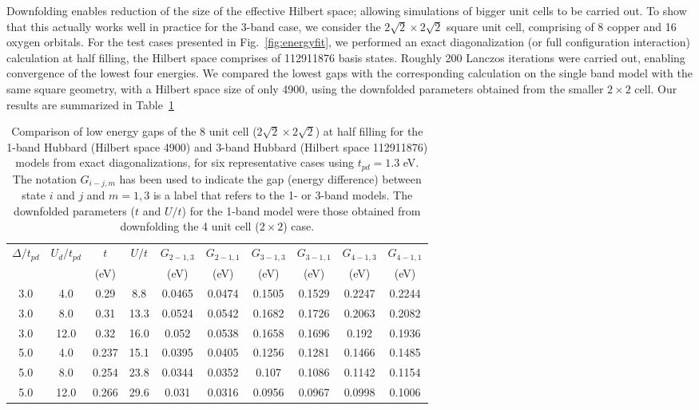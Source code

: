 Downfolding enables reduction of the size of the effective Hilbert space; allowing 
simulations of bigger unit cells to be carried out. To show that this actually works well in practice for the 3-band case, 
we consider the $2\sqrt{2} \times 2 \sqrt{2}$ square unit cell, comprising of 8 copper and 16 oxygen orbitals. 
For the test cases presented in Fig.~\ref{fig:energyfit}, we performed an exact diagonalization 
(or full configuration interaction) calculation at half filling, the Hilbert space comprises of 112911876 basis states. 
Roughly 200 Lanczos iterations were carried out, enabling convergence of the lowest four energies. 
We compared the lowest gaps with the corresponding calculation on the single 
band model with the same square geometry, with a Hilbert space size of only 4900, 
using the downfolded parameters obtained from the smaller $2 \times 2$ cell. Our results are summarized 
in Table~\ref{tab:predictivity}

\begin{table}[ht]
\centering
\begin{tabular}{c|c|c|c||c|c||c|c||c|c}
\hline
$\Delta/t_{pd}$ & $U_d/t_{pd}$ & $t$ & $U/t$ & $G_{2-1,3}$ & $G_{2-1,1}$ & $G_{3-1,3}$ & $G_{3-1,1}$ & $G_{4-1,3}$ & $G_{4-1,1}$  \\
                &              & (eV)&       & (eV)        & (eV)        & (eV)        & (eV)        & (eV)        & (eV)         \\
\hline
\hline
3.0 & 4.0 & 0.29 & 8.8 & 0.0465 & 0.0474 & 0.1505 & 0.1529 & 0.2247 & 0.2244  \\ 
3.0 & 8.0 & 0.31 & 13.3 & 0.0524 & 0.0542 & 0.1682 & 0.1726 & 0.2063 & 0.2082  \\ 
3.0 & 12.0 & 0.32 & 16.0 & 0.052 & 0.0538 & 0.1658 & 0.1696 & 0.192 & 0.1936  \\ 
5.0 & 4.0 & 0.237 & 15.1 & 0.0395 & 0.0405 & 0.1256 & 0.1281 & 0.1466 & 0.1485  \\ 
5.0 & 8.0 & 0.254 & 23.8 & 0.0344 & 0.0352 & 0.107 & 0.1086 & 0.1142 & 0.1154  \\ 
5.0 & 12.0 & 0.266 & 29.6 & 0.031 & 0.0316 & 0.0956 & 0.0967 & 0.0998 & 0.1006  \\ 
\hline
\end{tabular}
\caption{Comparison of low energy gaps of the 8 unit cell ($2\sqrt{2} \times 2\sqrt{2}$) at half filling for the 
1-band Hubbard (Hilbert space 4900) and 3-band Hubbard (Hilbert space 112911876) 
models from exact diagonalizations, for six representative cases using $t_{pd}=1.3 $ eV. The notation $G_{i-j,m}$ 
has been used to indicate the gap (energy difference) between state $i$ and $j$ and $m=1,3$ is a label that 
refers to the 1- or 3-band models. 
The downfolded parameters ($t$ and $U/t$) 
for the 1-band model were those obtained from downfolding the 4 unit cell ($2\times2$) case.}
\label{tab:predictivity}
\end{table} 



